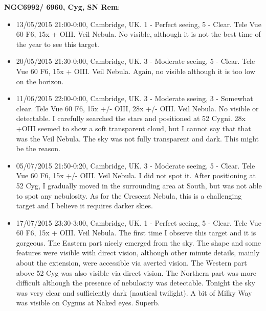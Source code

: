 {\bf NGC6992/ 6960, Cyg, SN Rem}:
\begin{itemize}
\item 13/05/2015 21:00-0:00, Cambridge, UK. 1 - Perfect seeing, 5 - Clear. Tele Vue 60 F6, 15x + OIII. Veil Nebula. No visible, although it is not the best time of the year to see this target.
\item 20/05/2015 21:30-0:00, Cambridge, UK. 3 - Moderate seeing, 5 - Clear. Tele Vue 60 F6, 15x + OIII. Veil Nebula. Again, no visible although it is too low on the horizon.
\item 11/06/2015 22:00-0:00, Cambridge, UK. 3 - Moderate seeing, 3 - Somewhat clear. Tele Vue 60 F6, 15x +/- OIII, 28x +/- OIII. Veil Nebula. No visible or detectable. I carefully searched the stars and positioned at 52 Cygni. 28x +OIII seemed to show a soft transparent cloud, but I cannot say that that was the Veil Nebula. The sky was not fully transparent and dark. This might be the reason.
\item 05/07/2015 21:50-0:20, Cambridge, UK. 3 - Moderate seeing, 5 - Clear. Tele Vue 60 F6, 15x +/- OIII. Veil Nebula. I did not spot it. After positioning at 52 Cyg, I gradually moved in the surrounding area at South, but was not able to spot any nebulosity. As for the Crescent Nebula, this is a challenging target and I believe it requires darker skies. 
\item 17/07/2015 23:30-3:00, Cambridge, UK. 1 - Perfect seeing, 5 - Clear. Tele Vue 60 F6, 15x + OIII. Veil Nebula. The first time I observe this target and it is gorgeous. The Eastern part nicely emerged from the sky. The shape and some features were visible with direct vision, although other minute details, mainly about the extension, were accessible via averted vision. The Western part above 52 Cyg was also visible via direct vision. The Northern part was more difficult although the presence of nebulosity was detectable. Tonight the sky was very clear and sufficiently dark (nautical twilight). A bit of Milky Way was visible on Cygnus at Naked eyes. Superb.
\end{itemize}
